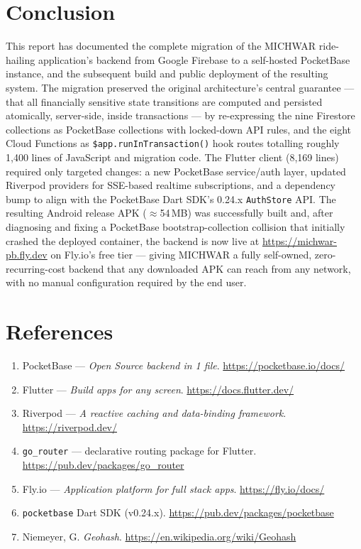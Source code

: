 \documentclass[11pt,a4paper]{article}
\begin{document}
\section{Conclusion}
\label{sec:conclusion}

This report has documented the complete migration of the MICHWAR
ride-hailing application's backend from Google Firebase to a self-hosted
PocketBase instance, and the subsequent build and public deployment of the
resulting system. The migration preserved the original architecture's
central guarantee --- that all financially sensitive state transitions are
computed and persisted atomically, server-side, inside transactions --- by
re-expressing the nine Firestore collections as PocketBase collections with
locked-down API rules, and the eight Cloud Functions as
\texttt{\$app.runInTransaction()} hook routes totalling roughly 1{,}400 lines
of JavaScript and migration code. The Flutter client (8{,}169 lines) required
only targeted changes: a new PocketBase service/auth layer, updated Riverpod
providers for SSE-based realtime subscriptions, and a dependency bump to
align with the PocketBase Dart SDK's 0.24.x \texttt{AuthStore} API. The
resulting Android release APK ($\approx$54\,MB) was successfully built and,
after diagnosing and fixing a PocketBase bootstrap-collection collision that
initially crashed the deployed container, the backend is now live at
\url{https://michwar-pb.fly.dev} on Fly.io's free tier --- giving MICHWAR a
fully self-owned, zero-recurring-cost backend that any downloaded APK can
reach from any network, with no manual configuration required by the end
user.


\section*{References}
\begin{enumerate}[nosep]
  \item PocketBase --- \textit{Open Source backend in 1 file}.
    \url{https://pocketbase.io/docs/}
  \item Flutter --- \textit{Build apps for any screen}.
    \url{https://docs.flutter.dev/}
  \item Riverpod --- \textit{A reactive caching and data-binding framework}.
    \url{https://riverpod.dev/}
  \item \texttt{go\_router} --- declarative routing package for Flutter.
    \url{https://pub.dev/packages/go_router}
  \item Fly.io --- \textit{Application platform for full stack apps}.
    \url{https://fly.io/docs/}
  \item \texttt{pocketbase} Dart SDK (v0.24.x).
    \url{https://pub.dev/packages/pocketbase}
  \item Niemeyer, G. \textit{Geohash}. \url{https://en.wikipedia.org/wiki/Geohash}
\end{enumerate}
\end{document}
